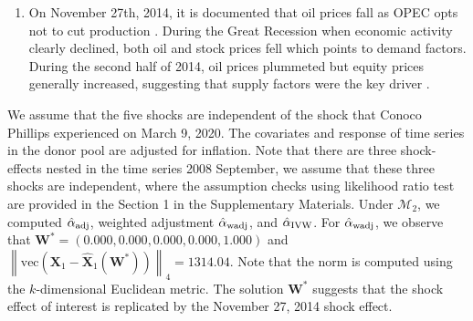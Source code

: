 \documentclass[11pt]{article}
\def\mbf#1{\mathbf{#1}} %
\def\mrm#1{\mathrm{#1}} %
\def\mc#1{\mathcal{#1}} %
\newcommand{\norm}[1]{\left\lVert#1\right\rVert} %
\theoremstyle{definition}
\begin{document}
\begin{enumerate}
\begin{enumerate}
  \item On November 27th, 2014, it is documented that oil prices fall as OPEC opts not to cut production \citep{huppmann2015opec}. During the Great Recession when economic activity clearly declined, both oil and stock prices fell which points to demand factors. During the second half of 2014, oil prices plummeted but equity prices generally increased, suggesting that supply factors were the key driver \citep[Page 19]{baffes2015great}. 
  \end{enumerate}
\end{enumerate}


We assume that the five shocks are independent of the shock that Conoco Phillips experienced on March 9, 2020. The covariates and response of time series in the donor pool are adjusted for inflation. Note that there are three shock-effects nested in the time series 2008 September, we assume that these three shocks are independent, where the assumption checks using likelihood ratio test are provided in the Section 1 in the Supplementary Materials. Under $\mc{M}_{2}$, we computed $\hat{\alpha}_{\rm adj}$, weighted adjustment $\hat{\alpha}_{\rm wadj}$, and $\hat{\alpha}_{\rm IVW}$. For $\hat{\alpha}_{\rm wadj}$, we observe that 
$
  \mathbf{W}^*= (0.000,0.000, 0.000, 0.000, 1.000)
$
and 
$
  \norm{\mrm{vec}\left(\mbf{X}_1-\hat{\mbf{X}}_1(\mbf{W}^*)\right)}_{4} = 1314.04.
$
Note that the norm is computed using the $k$-dimensional Euclidean metric. The solution $\mathbf{W}^*$ suggests that the shock effect of interest is replicated by the November 27, 2014 shock effect. 

\end{document}
